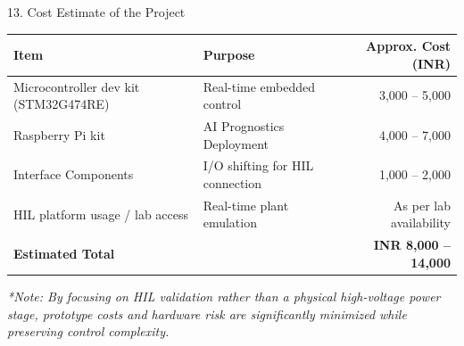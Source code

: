 \documentclass[aspectratio=169]{beamer}
\begin{document}
\begin{frame}{13. Cost Estimate of the Project}
    \centering
    \small
    \begin{tabular}{l l r}
        \toprule
        \textbf{Item} & \textbf{Purpose} & \textbf{Approx. Cost (INR)} \\
        \midrule
        Microcontroller dev kit (STM32G474RE) & Real-time embedded control & 3,000 -- 5,000 \\
        Raspberry Pi kit & AI Prognostics Deployment & 4,000 -- 7,000 \\
        Interface Components & I/O shifting for HIL connection & 1,000 -- 2,000 \\
        HIL platform usage / lab access & Real-time plant emulation & As per lab availability \\
        \midrule
        \textbf{Estimated Total} & & \textbf{INR 8,000 -- 14,000} \\
        \bottomrule
    \end{tabular}
    \vspace{0.3cm}
    
    \textit{*Note: By focusing on HIL validation rather than a physical high-voltage power stage, prototype costs and hardware risk are significantly minimized while preserving control complexity.}
\end{frame}
\end{document}
